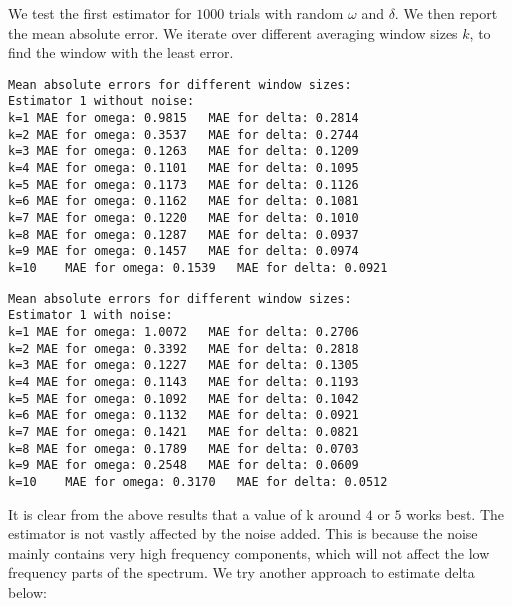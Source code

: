 \documentclass[11pt]{article}
\begin{document}
	

	

	
		
    We test the first estimator for \(1000\) trials with random \(\omega\)
and \(\delta\). We then report the mean absolute error. We iterate over
different averaging window sizes \(k\), to find the window with the
least error.

	

	

    \begin{Verbatim}[commandchars=\\\{\}]
Mean absolute errors for different window sizes:
Estimator 1 without noise:
k=1	MAE for omega: 0.9815	MAE for delta: 0.2814
k=2	MAE for omega: 0.3537	MAE for delta: 0.2744
k=3	MAE for omega: 0.1263	MAE for delta: 0.1209
k=4	MAE for omega: 0.1101	MAE for delta: 0.1095
k=5	MAE for omega: 0.1173	MAE for delta: 0.1126
k=6	MAE for omega: 0.1162	MAE for delta: 0.1081
k=7	MAE for omega: 0.1220	MAE for delta: 0.1010
k=8	MAE for omega: 0.1287	MAE for delta: 0.0937
k=9	MAE for omega: 0.1457	MAE for delta: 0.0974
k=10	MAE for omega: 0.1539	MAE for delta: 0.0921

    \end{Verbatim}

	

    \begin{Verbatim}[commandchars=\\\{\}]
Mean absolute errors for different window sizes:
Estimator 1 with noise:
k=1	MAE for omega: 1.0072	MAE for delta: 0.2706
k=2	MAE for omega: 0.3392	MAE for delta: 0.2818
k=3	MAE for omega: 0.1227	MAE for delta: 0.1305
k=4	MAE for omega: 0.1143	MAE for delta: 0.1193
k=5	MAE for omega: 0.1092	MAE for delta: 0.1042
k=6	MAE for omega: 0.1132	MAE for delta: 0.0921
k=7	MAE for omega: 0.1421	MAE for delta: 0.0821
k=8	MAE for omega: 0.1789	MAE for delta: 0.0703
k=9	MAE for omega: 0.2548	MAE for delta: 0.0609
k=10	MAE for omega: 0.3170	MAE for delta: 0.0512

    \end{Verbatim}

	
		
    It is clear from the above results that a value of k around \(4\) or
\(5\) works best. The estimator is not vastly affected by the noise
added. This is because the noise mainly contains very high frequency
components, which will not affect the low frequency parts of the
spectrum. We try another approach to estimate delta below:

	
\end{document}
